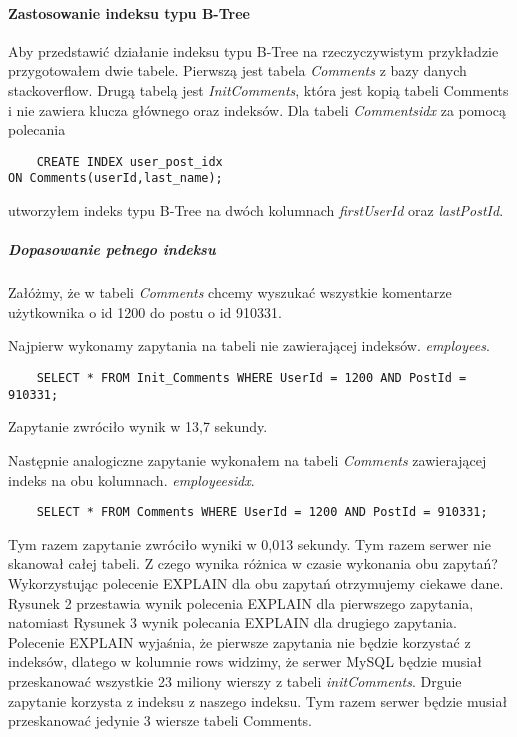\paragraph{Zastosowanie indeksu typu B-Tree}\mbox{}

Aby przedstawić działanie indeksu typu B-Tree na rzeczyczywistym przykładzie przygotowałem dwie tabele. Pierwszą jest tabela \textit{Comments} z bazy danych stackoverflow. Drugą tabelą jest \textit{Init\textunderscore Comments}, która jest kopią tabeli Comments i nie zawiera klucza głównego oraz indeksów.
Dla tabeli \textit{Comments\textunderscore idx} za pomocą polecania \begin{verbatim}
    CREATE INDEX user_post_idx 
ON Comments(userId,last_name);
\end{verbatim}
utworzyłem indeks typu B-Tree na dwóch kolumnach \textit{first\textunderscore UserId} oraz \textit{last\textunderscore PostId}.

\subparagraph{Dopasowanie pełnego indeksu}\mbox{}

Załóżmy, że w tabeli \textit{Comments} chcemy wyszukać wszystkie komentarze użytkownika o id 1200 do postu o id 910331.

Najpierw wykonamy zapytania na tabeli nie zawierającej indeksów.
 \textit{employees}. 
\begin{verbatim}
    SELECT * FROM Init_Comments WHERE UserId = 1200 AND PostId = 910331;
\end{verbatim}
Zapytanie zwróciło wynik w 13,7 sekundy.

Następnie analogiczne zapytanie wykonałem na tabeli \textit{Comments} zawierającej indeks na obu kolumnach.
\textit{employees\textunderscore idx}. 
\begin{verbatim}
    SELECT * FROM Comments WHERE UserId = 1200 AND PostId = 910331;
\end{verbatim}
Tym razem zapytanie zwróciło wyniki w 0,013 sekundy. Tym razem serwer nie skanował całej tabeli. Z czego wynika różnica w czasie wykonania obu zapytań? Wykorzystując polecenie EXPLAIN dla obu zapytań otrzymujemy ciekawe dane. Rysunek 2 przestawia wynik polecenia EXPLAIN dla pierwszego zapytania, natomiast Rysunek 3 wynik polecania EXPLAIN dla drugiego zapytania. Polecenie EXPLAIN wyjaśnia, że pierwsze zapytania nie będzie korzystać z indeksów, dlatego w kolumnie rows widzimy, że serwer MySQL będzie musiał przeskanować wszystkie 23 miliony wierszy z tabeli \textit{init\textunderscore Comments}. Drguie zapytanie korzysta z indeksu z naszego indeksu. Tym razem serwer będzie musiał przeskanować jedynie 3 wiersze tabeli Comments. 

